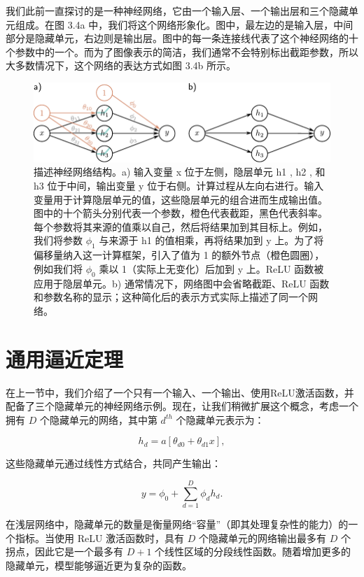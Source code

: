 \documentclass[lang=cn,newtx,10pt,scheme=chinese]{elegantbook}
\begin{document}
我们此前一直探讨的是一种神经网络，它由一个输入层、一个输出层和三个隐藏单元组成。在图 3.4a 中，我们将这个网络形象化。图中，最左边的是输入层，中间部分是隐藏单元，右边则是输出层。图中的每一条连接线代表了这个神经网络的十个参数中的一个。而为了图像表示的简洁，我们通常不会特别标出截距参数，所以大多数情况下，这个网络的表达方式如图 3.4b 所示。

\begin{figure}[ht!]
	\centering
	\includegraphics[width=0.7\linewidth]{PDFFigures/UDLChap3PDF/ShallowNet.pdf}
  \caption{描述神经网络结构。a) 输入变量 x 位于左侧，隐层单元 h1 , h2 , 和 h3 位于中间，输出变量 y 位于右侧。计算过程从左向右进行。输入变量用于计算隐层单元的值，这些隐层单元的组合进而生成输出值。图中的十个箭头分别代表一个参数，橙色代表截距，黑色代表斜率。每个参数将其来源的值乘以自己，然后将结果加到其目标上。例如，我们将参数 $\phi_1$ 与来源于 h1 的值相乘，再将结果加到 y 上。为了将偏移量纳入这一计算框架，引入了值为 1 的额外节点（橙色圆圈），例如我们将 \(\phi_0\) 乘以 1（实际上无变化）后加到 y 上。ReLU 函数被应用于隐层单元。b) 通常情况下，网络图中会省略截距、ReLU 函数和参数名称的显示；这种简化后的表示方式实际上描述了同一个网络。}
\end{figure}

\section{通用逼近定理}
在上一节中，我们介绍了一个只有一个输入、一个输出、使用ReLU激活函数，并配备了三个隐藏单元的神经网络示例。现在，让我们稍微扩展这个概念，考虑一个拥有 \(D\) 个隐藏单元的网络，其中第 \(d^{th}\) 个隐藏单元表示为：

\begin{equation}
h_d = a[\theta_{d0} + \theta_{d1}x], 
\end{equation}

这些隐藏单元通过线性方式结合，共同产生输出：


\begin{equation}
y = \phi_0 + \sum_{d=1}^{D} \phi_dh_d. 
\end{equation}

在浅层网络中，隐藏单元的数量是衡量网络“容量”（即其处理复杂性的能力）的一个指标。当使用 ReLU 激活函数时，具有 \(D\) 个隐藏单元的网络输出最多有 \(D\) 个拐点，因此它是一个最多有 \(D + 1\) 个线性区域的分段线性函数。随着增加更多的隐藏单元，模型能够逼近更为复杂的函数。
\end{document}
